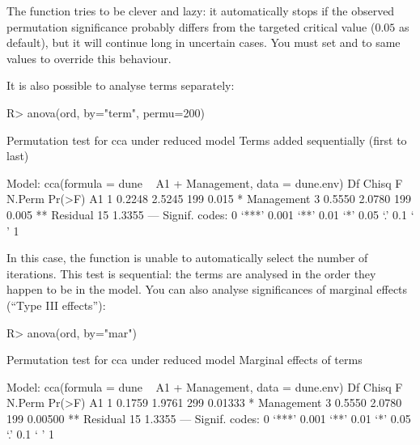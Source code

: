 \documentclass[article,nojss]{jss}
\begin{document}
The  function tries to be clever and lazy: it
automatically stops if the observed permutation significance probably
differs from the targeted critical value ($0.05$ as default), but it
will continue long in uncertain cases.  You must set  and
 to same values to override this behaviour.

It is also possible to analyse terms separately:
\begin{Schunk}
\begin{Sinput}
R> anova(ord, by="term", permu=200)
\end{Sinput}
\begin{Soutput}
Permutation test for cca under reduced model
Terms added sequentially (first to last)

Model: cca(formula = dune ~ A1 + Management, data = dune.env)
           Df  Chisq      F N.Perm Pr(>F)   
A1          1 0.2248 2.5245    199  0.015 * 
Management  3 0.5550 2.0780    199  0.005 **
Residual   15 1.3355                        
---
Signif. codes:  0 ‘***’ 0.001 ‘**’ 0.01 ‘*’ 0.05 ‘.’ 0.1 ‘ ’ 1 
\end{Soutput}
\end{Schunk}
In this case, the function is unable to automatically select the
number of iterations. This test is sequential: the terms are analysed
in the order they happen to be in the model. You can also analyse
significances of marginal effects (``Type III effects''):
\begin{Schunk}
\begin{Sinput}
R> anova(ord, by="mar")
\end{Sinput}
\begin{Soutput}
Permutation test for cca under reduced model
Marginal effects of terms

Model: cca(formula = dune ~ A1 + Management, data = dune.env)
           Df  Chisq      F N.Perm  Pr(>F)   
A1          1 0.1759 1.9761    299 0.01333 * 
Management  3 0.5550 2.0780    199 0.00500 **
Residual   15 1.3355                         
---
Signif. codes:  0 ‘***’ 0.001 ‘**’ 0.01 ‘*’ 0.05 ‘.’ 0.1 ‘ ’ 1 
\end{Soutput}
\end{Schunk}
\end{document}
